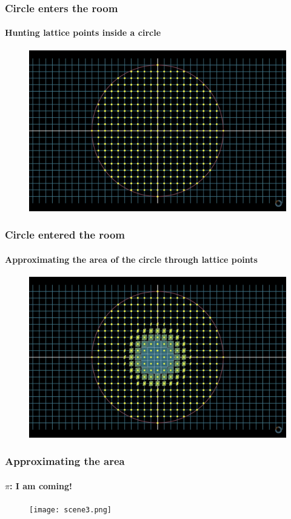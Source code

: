 \documentclass{beamer}
\begin{document}
    \begin{frame}
        \frametitle{Circle enters the room}
        \framesubtitle{Hunting lattice points inside a circle}
        \begin{figure}
            \includegraphics[scale=0.20]{scene1.png}
        \end{figure}
    \end{frame}

    \begin{frame}
        \frametitle{Circle entered the room}
        \framesubtitle{Approximating the area of the circle through lattice points}
        \begin{figure}
            \includegraphics[scale=0.20]{scene2.png}
        \end{figure}
    \end{frame}

    \begin{frame}
        \frametitle{Approximating the area}
        \framesubtitle{\(\pi\): I am coming!}
        \begin{figure}
            \texttt{[image: scene3.png]}
        \end{figure}
    \end{frame}
\end{document}
